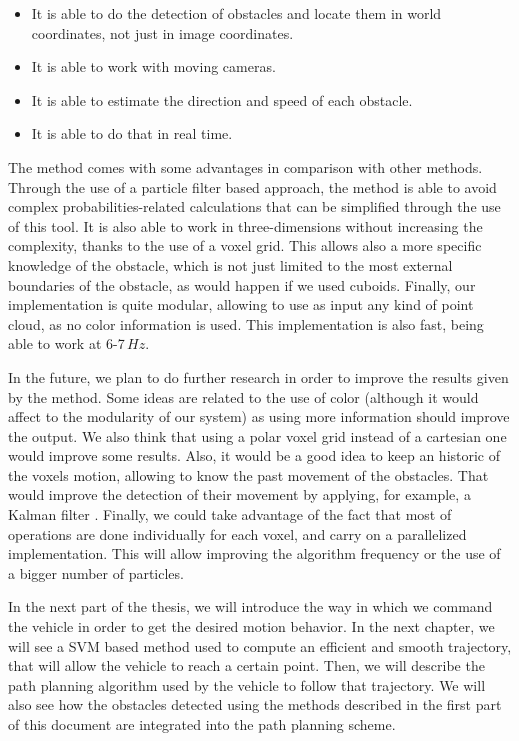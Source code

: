 \begin{itemize}
 \item It is able to do the detection of obstacles and locate them in world coordinates, not just in image coordinates.
 \item It is able to work with moving cameras.
 \item It is able to estimate the direction and speed of each obstacle.
 \item It is able to do that in real time.
\end{itemize}



The method comes with some advantages in comparison with other methods. Through the use of a particle filter based approach, the method is able to avoid complex probabilities-related calculations that can be simplified through the use of this tool. It is also able to work in three-dimensions without increasing the complexity, thanks to the use of a voxel grid. This allows also a more specific knowledge of the obstacle, which is not just limited to the most external boundaries of the obstacle, as would happen if we used cuboids. Finally, our implementation is quite modular, allowing to use as input any kind of point cloud, as no color information is used. This implementation is also fast, being able to work at 6-7\,$Hz$.

In the future, we plan to do further research in order to improve the results given by the method. Some ideas are related to the use of color (although it would affect to the modularity of our system) as using more information should improve the output. We also think that using a polar voxel grid instead of a cartesian one would improve some results. Also, it would be a good idea to keep an historic of the voxels motion, allowing to know the past movement of the obstacles. That would improve the detection of their movement by applying, for example, a Kalman filter \citep{kalman1960new}. Finally, we could take advantage of the fact that most of operations are done individually for each voxel, and carry on a parallelized implementation. This will allow improving the algorithm frequency or the use of a bigger number of particles.

In the next part of the thesis, we will introduce the way in which we command the vehicle in order to get the desired motion behavior. In the next chapter, we will see a \ac{SVM} based method used to compute an efficient and smooth trajectory, that will allow the vehicle to reach a certain point. Then, we will describe the path planning algorithm used by the vehicle to follow that trajectory. We will also see how the obstacles detected using the methods described in the first part of this document are integrated into the path planning scheme.
 
 
 
 
